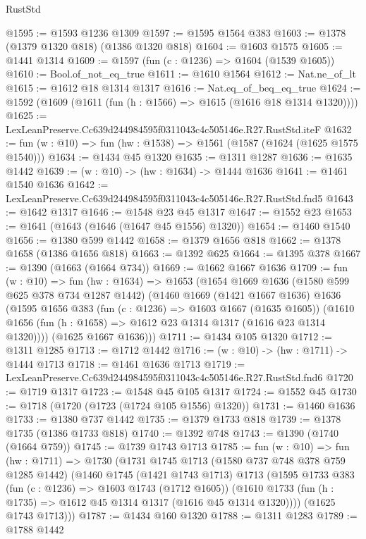 \begin{lexlean}{RustStd}
\begin{coremodule}
@1595 := @1593 @1236 @1309
@1597 := @1595 @1564 @383
@1603 := @1378 (@1379 @1320 @818) (@1386 @1320 @818)
@1604 := @1603 @1575
@1605 := @1441 @1314
@1609 := @1597 (fun (c : @1236) => @1604 (@1539 @1605))
@1610 := Bool.of_not_eq_true
@1611 := @1610 @1564
@1612 := Nat.ne_of_lt
@1615 := @1612 @18 @1314 @1317
@1616 := Nat.eq_of_beq_eq_true
@1624 := @1592 (@1609 (@1611 (fun (h : @1566) => @1615 (@1616 @18 @1314 @1320))))
@1625 := LexLeanPreserve.Cc639d244984595f0311043c4c505146e.R27.RustStd.iteF
@1632 := fun (w : @10) => fun (hw : @1538) => @1561 (@1587 (@1624 (@1625 @1575 @1540)))
@1634 := @1434 @45 @1320
@1635 := @1311 @1287
@1636 := @1635 @1442
@1639 := (w : @10) -> (hw : @1634) -> @1444 @1636
@1641 := @1461 @1540 @1636
@1642 := LexLeanPreserve.Cc639d244984595f0311043c4c505146e.R27.RustStd.fnd5
@1643 := @1642 @1317
@1646 := @1548 @23 @45 @1317
@1647 := @1552 @23
@1653 := @1641 (@1643 (@1646 (@1647 @45 @1556) @1320))
@1654 := @1460 @1540
@1656 := @1380 @599 @1442
@1658 := @1379 @1656 @818
@1662 := @1378 @1658 (@1386 @1656 @818)
@1663 := @1392 @625
@1664 := @1395 @378
@1667 := @1390 (@1663 (@1664 @734))
@1669 := @1662 @1667 @1636
@1709 := fun (w : @10) =>
  fun (hw : @1634) =>
  @1653
    (@1654
      @1669
      @1636
      (@1580 @599 @625 @378 @734 @1287 @1442)
      (@1460
        @1669
        (@1421 @1667 @1636)
        @1636
        (@1595
          @1656
          @383
          (fun (c : @1236) => @1603 @1667 (@1635 @1605))
          (@1610 @1656 (fun (h : @1658) => @1612 @23 @1314 @1317 (@1616 @23 @1314 @1320))))
        (@1625 @1667 @1636)))
@1711 := @1434 @105 @1320
@1712 := @1311 @1285
@1713 := @1712 @1442
@1716 := (w : @10) -> (hw : @1711) -> @1444 @1713
@1718 := @1461 @1636 @1713
@1719 := LexLeanPreserve.Cc639d244984595f0311043c4c505146e.R27.RustStd.fnd6
@1720 := @1719 @1317
@1723 := @1548 @45 @105 @1317
@1724 := @1552 @45
@1730 := @1718 (@1720 (@1723 (@1724 @105 @1556) @1320))
@1731 := @1460 @1636
@1733 := @1380 @737 @1442
@1735 := @1379 @1733 @818
@1739 := @1378 @1735 (@1386 @1733 @818)
@1740 := @1392 @748
@1743 := @1390 (@1740 (@1664 @759))
@1745 := @1739 @1743 @1713
@1785 := fun (w : @10) =>
  fun (hw : @1711) =>
  @1730
    (@1731
      @1745
      @1713
      (@1580 @737 @748 @378 @759 @1285 @1442)
      (@1460
        @1745
        (@1421 @1743 @1713)
        @1713
        (@1595
          @1733
          @383
          (fun (c : @1236) => @1603 @1743 (@1712 @1605))
          (@1610 @1733 (fun (h : @1735) => @1612 @45 @1314 @1317 (@1616 @45 @1314 @1320))))
        (@1625 @1743 @1713)))
@1787 := @1434 @160 @1320
@1788 := @1311 @1283
@1789 := @1788 @1442

\end{coremodule}
\end{lexlean}
